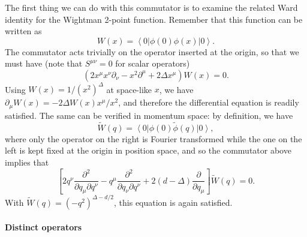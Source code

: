 \documentclass[a4paper,12pt]{article}
\newcommand{\ket}[1]{\left| #1 \right\rangle}
\newcommand{\bra}[1]{\left\langle #1 \right|}
\numberwithin{equation}{section}
\begin{document}
The first thing we can do with this commutator is to examine the related Ward identity for the Wightman 2-point function. Remember that this function can be written as
\begin{equation}
	W(x) = \bra{0} \phi(0) \phi(x) \ket{0}.
\end{equation}
The commutator acts trivially on the operator inserted at the origin, so that we must have (note that $S^{\mu\nu} = 0$ for scalar operators)
\begin{equation}
	\left( 2 x^\mu x^\nu \partial_\nu - x^2 \partial^\mu 
	+ 2 \Delta x^\mu \right) W(x) = 0.
\end{equation}
Using $W(x) = 1 /(x^2)^{\Delta}$ at space-like $x$, we have $\partial_\mu W(x) = - 2 \Delta W(x) x^\mu / x^2$, and therefore the differential equation is readily satisfied.
The same can be verified in momentum space: by definition, we have
\begin{equation}
	\widetilde{W}(q) = \bra{0} \phi(0) \widetilde{\phi}(q) \ket{0},
\end{equation}
where only the operator on the right is Fourier transformed while the one on the left is kept fixed at the origin in position space, and so the commutator above implies that
\begin{equation}
	\left[ 2 q^\nu \frac{\partial^2}{\partial q_\mu \partial q^\nu} 
	- q^\mu \frac{\partial^2}{\partial q_\nu \partial q^\nu}
	+ 2 (d - \Delta) \frac{\partial}{\partial q_\mu} \right]
	\widetilde{W}(q) = 0.
\end{equation}
With $\widetilde{W}(q) = (-q^2)^{\Delta - d/2}$, this equation is again satisfied.

\paragraph{Distinct operators}
\end{document}
